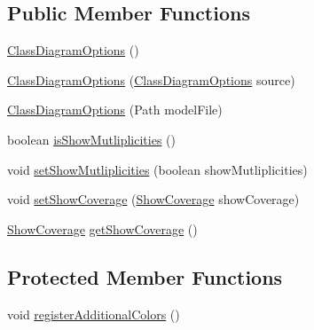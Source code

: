 \subsection*{Public Member Functions}
\begin{DoxyCompactItemize}
\item 
\hyperlink{classorg_1_1tzi_1_1use_1_1gui_1_1views_1_1diagrams_1_1classdiagram_1_1_class_diagram_options_a1be4fe7166a9f51d0ca9b282baf40094}{Class\-Diagram\-Options} ()
\item 
\hyperlink{classorg_1_1tzi_1_1use_1_1gui_1_1views_1_1diagrams_1_1classdiagram_1_1_class_diagram_options_a1c2bbcba5a812e605c42fb5c57736da1}{Class\-Diagram\-Options} (\hyperlink{classorg_1_1tzi_1_1use_1_1gui_1_1views_1_1diagrams_1_1classdiagram_1_1_class_diagram_options}{Class\-Diagram\-Options} source)
\item 
\hyperlink{classorg_1_1tzi_1_1use_1_1gui_1_1views_1_1diagrams_1_1classdiagram_1_1_class_diagram_options_a97b6f4974b5019da15aa57a0a17e8bb2}{Class\-Diagram\-Options} (Path model\-File)
\item 
boolean \hyperlink{classorg_1_1tzi_1_1use_1_1gui_1_1views_1_1diagrams_1_1classdiagram_1_1_class_diagram_options_a342a2ad105d5b741a4d7ec5505674e97}{is\-Show\-Mutliplicities} ()
\item 
void \hyperlink{classorg_1_1tzi_1_1use_1_1gui_1_1views_1_1diagrams_1_1classdiagram_1_1_class_diagram_options_a65d7a2227d93a8b4924a4715470f4315}{set\-Show\-Mutliplicities} (boolean show\-Mutliplicities)
\item 
void \hyperlink{classorg_1_1tzi_1_1use_1_1gui_1_1views_1_1diagrams_1_1classdiagram_1_1_class_diagram_options_abd48d2d2ebfca797212cc98c9d68eff2}{set\-Show\-Coverage} (\hyperlink{enumorg_1_1tzi_1_1use_1_1gui_1_1views_1_1diagrams_1_1classdiagram_1_1_class_diagram_options_1_1_show_coverage}{Show\-Coverage} show\-Coverage)
\item 
\hyperlink{enumorg_1_1tzi_1_1use_1_1gui_1_1views_1_1diagrams_1_1classdiagram_1_1_class_diagram_options_1_1_show_coverage}{Show\-Coverage} \hyperlink{classorg_1_1tzi_1_1use_1_1gui_1_1views_1_1diagrams_1_1classdiagram_1_1_class_diagram_options_abbfe8ac1a54127b354bff78bae63d04c}{get\-Show\-Coverage} ()
\end{DoxyCompactItemize}
\subsection*{Protected Member Functions}
\begin{DoxyCompactItemize}
\item 
void \hyperlink{classorg_1_1tzi_1_1use_1_1gui_1_1views_1_1diagrams_1_1classdiagram_1_1_class_diagram_options_abc2ffb022fda0054b762702b03db93cd}{register\-Additional\-Colors} ()
\end{DoxyCompactItemize}
